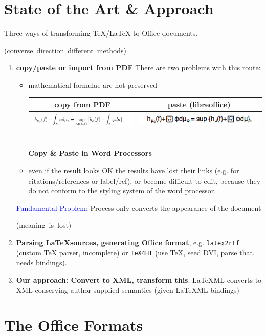 \documentclass[a0,landscape]{a0poster}
\def\latexml{{\LaTeX}ML\xspace}
\def\lec#1{\strut\hfil\strut\null\nobreak\hfill\hbox{(#1)}\par}
\def\blue#1{\textcolor{blue}{#1}}
\begin{document}
\begin{multicols}{3}
\section*{State of the Art \& Approach}
Three ways of transforming {\TeX/\LaTeX} to Office documents.\lec{converse direction
  different methods}
\begin{enumerate}
\item \textbf{copy/paste or import from PDF} There are two problems with this route:
\begin{itemize}
\item mathematical formulae are not preserved 
\begin{center}
  \begin{tabular}{|c|c|}\hline%
    copy from PDF & paste (libreoffice)\\\hline
    \includegraphics[width=17.5cm]{mathsnippet} & 
    \includegraphics[width=17.5cm]{mathsnippet-libreoffice}\\\hline
  \end{tabular}\\
\textbf{Copy \& Paste in Word Processors}
\end{center}
\item even if the result looks OK the results have lost their links (e.g. for
  citations/references or label/ref), or become difficult to edit, because they do not
  conform to the styling system of the word processor.
\end{itemize}
\blue{Fundamental Problem}: Process only converts the appearance of the
document\lec{meaning is lost}
\item \textbf{Parsing \LaTeX sources, generating Office format}, e.g. \texttt{latex2rtf}
  (custom {\TeX} parser, incomplete) or \texttt{TeX4HT} (use {\TeX}, seed DVI, parse that,
  needs bindings).
\item \textbf{Our approach: Convert {\LaTex} to XML, transform this}: \latexml converts to
  XML conserving author-supplied semantics (given \latexml bindings)
\end{enumerate}

\section*{The Office Formats}\label{sec:target}


\end{multicols}
\end{document}
